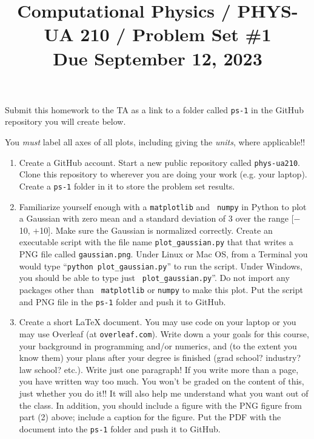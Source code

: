 \documentclass[11pt, preprint]{aastex}
\begin{document}
\title{\bf Computational Physics / PHYS-UA 210 / Problem Set \#1
\\ Due September 12, 2023 }

Submit this homework to the TA as a link to a folder called {\tt ps-1}
in the GitHub repository you will create below.

You {\it must} label all axes of all plots, including giving the {\it
  units}, where applicable!!

\begin{enumerate}

  \item Create a GitHub account. Start a new public repository called
    {\tt phys-ua210}. Clone this repository to wherever you are doing
    your work (e.g. your laptop). Create a {\tt ps-1} folder in it to
    store the problem set results.

  \item Familiarize yourself enough with a {\tt matplotlib} and {\tt
    numpy} in Python to plot a Gaussian with zero mean and a standard
    deviation of 3 over the range [$-$10, $+$10]. Make sure the
    Gaussian is normalized correctly. Create an executable script with
    the file name {\tt plot\_gaussian.py} that that writes a PNG file
    called {\tt gaussian.png}. Under Linux or Mac OS, from a Terminal
    you would type ``{\tt python plot\_gaussian.py}'' to run the
    script. Under Windows, you should be able to type just {\tt
      plot\_gaussian.py}''. Do not import any packages other than {\tt
      matplotlib} or {\tt numpy} to make this plot. Put the script and
    PNG file in the {\tt ps-1} folder and push it to GitHub.

  \item Create a short LaTeX document. You may use code on your laptop
    or you may use Overleaf (at {\tt overleaf.com}). Write down a your
    goals for this course, your background in programming and/or
    numerics, and (to the extent you know them) your plans after your
    degree is finished (grad school? industry?  law school?
    etc.). Write just one paragraph! If you write more than a page,
    you have written way too much. You won't be graded on the content
    of this, just whether you do it!! It will also help me understand
    what you want out of the class. In addition, you should include a
    figure with the PNG figure from part (2) above; include a caption
    for the figure. Put the PDF with the document into the {\tt ps-1}
    folder and push it to GitHub.

\end{enumerate}
\end{document}
